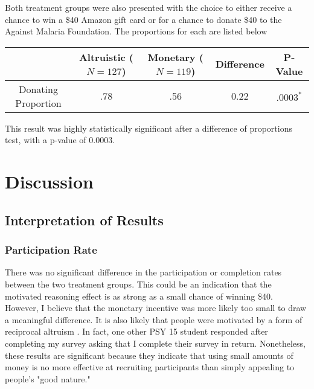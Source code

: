 \documentclass[12pt]{article}
\begin{document}
Both treatment groups were also presented with the choice to either receive a chance to win a \$40 Amazon gift card or for a chance to donate \$40 to the Against Malaria Foundation. The proportions for each are listed below

\begin{center}
    \begin{tabular}{c| c c | c c}
         & \parbox[t]{2cm}{\textbf{Altruistic}\\($N = 127$)} & \parbox[t]{2cm}{\textbf{Monetary}\\($N = 119$)} & \textbf{Difference} & \textbf{P-Value}\\
         \hline
         Donating Proportion & .78 & .56 & 0.22 &  $.0003^{*}$
    \end{tabular}
\end{center}
This result was highly statistically significant after a difference of proportions test, with a p-value of 0.0003. 

\section{Discussion}
\subsection{Interpretation of Results}
\subsubsection{Participation Rate}
There was no significant difference in the participation or completion rates between the two treatment groups. This could be an indication that the motivated reasoning effect is as strong as a small chance of winning \$40. However, I believe that the monetary incentive was more likely too small to draw a meaningful difference. It is also likely that people were motivated by a form of reciprocal altruism \citep{trivers}. In fact, one other PSY 15 student responded after completing my survey asking that I complete their survey in return. Nonetheless, these results are significant because they indicate that using small amounts of money is no more effective at recruiting participants than simply appealing to people's "good nature."
\end{document}

